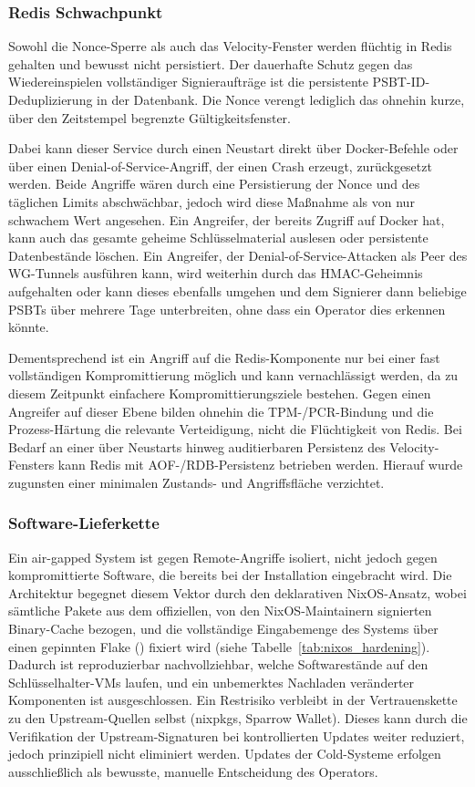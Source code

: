 \subsubsection{Redis Schwachpunkt} \label{sec:redis_schwach}
Sowohl die Nonce-Sperre als auch das Velocity-Fenster werden flüchtig in Redis gehalten und bewusst nicht persistiert. Der dauerhafte Schutz gegen das Wiedereinspielen vollständiger Signieraufträge ist die persistente \ac{PSBT}-\ac{ID}-Deduplizierung in der Datenbank. Die Nonce verengt lediglich das ohnehin kurze, über den Zeitstempel begrenzte Gültigkeitsfenster.

Dabei kann dieser Service durch einen Neustart direkt über Docker-Befehle oder über einen Denial-of-Service-Angriff, der einen Crash erzeugt, zurückgesetzt werden. Beide Angriffe wären durch eine Persistierung der Nonce und des täglichen Limits abschwächbar, jedoch wird diese Maßnahme als von nur schwachem Wert angesehen. Ein Angreifer, der bereits Zugriff auf Docker hat, kann auch das gesamte geheime Schlüsselmaterial auslesen oder persistente Datenbestände löschen. Ein Angreifer, der Denial-of-Service-Attacken als Peer des \ac{WG}-Tunnels ausführen kann, wird weiterhin durch das \ac{HMAC}-Geheimnis aufgehalten oder kann dieses ebenfalls umgehen und dem Signierer dann beliebige \acp{PSBT} über mehrere Tage unterbreiten, ohne dass ein Operator dies erkennen könnte.

Dementsprechend ist ein Angriff auf die Redis-Komponente nur bei einer fast vollständigen Kompromittierung möglich und kann vernachlässigt werden, da zu diesem Zeitpunkt einfachere Kompromittierungsziele bestehen. Gegen einen Angreifer auf dieser Ebene bilden ohnehin die \ac{TPM}-/\ac{PCR}-Bindung und die Prozess-Härtung die relevante Verteidigung, nicht die Flüchtigkeit von Redis. Bei Bedarf an einer über Neustarts hinweg auditierbaren Persistenz des Velocity-Fensters kann Redis mit AOF-/RDB-Persistenz betrieben werden. Hierauf wurde zugunsten einer minimalen Zustands- und Angriffsfläche verzichtet.

\subsubsection{Software-Lieferkette}
Ein air-gapped System ist gegen Remote-Angriffe isoliert, nicht jedoch gegen kompromittierte Software, die bereits bei der Installation eingebracht wird.
Die Architektur begegnet diesem Vektor durch den deklarativen NixOS-Ansatz, wobei sämtliche Pakete aus dem offiziellen, von den NixOS-Maintainern signierten Binary-Cache bezogen, und die vollständige Eingabemenge des Systems über einen gepinnten Flake () fixiert wird (siehe Tabelle~\ref{tab:nixos_hardening}). 
Dadurch ist reproduzierbar nachvollziehbar, welche Softwarestände auf den Schlüsselhalter-\acp{VM} laufen, und ein unbemerktes Nachladen veränderter Komponenten ist ausgeschlossen. 
Ein Restrisiko verbleibt in der Vertrauenskette zu den Upstream-Quellen selbst
(nixpkgs, Sparrow Wallet). Dieses kann durch die Verifikation der Upstream-Signaturen bei kontrollierten Updates weiter reduziert, jedoch prinzipiell nicht eliminiert werden. 
Updates der Cold-Systeme erfolgen ausschließlich als bewusste, manuelle Entscheidung des Operators.

